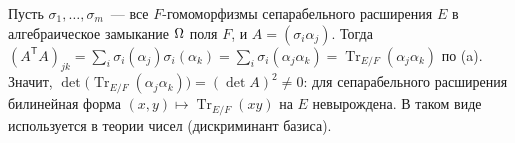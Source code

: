 \begin{remark}[5.16b]
Пусть $\sigma_1,\dots,\sigma_m$~--- все $F$-гомоморфизмы сепарабельного расширения $E$ в алгебраическое замыкание $\Omega$
поля $F$, и $A=(\sigma_i\alpha_j)$. Тогда $(A^{\mathsf T}A)_{jk}=\sum_i\sigma_i(\alpha_j)\sigma_i(\alpha_k)
=\sum_i\sigma_i(\alpha_j\alpha_k)=\operatorname{Tr}_{E/F}(\alpha_j\alpha_k)$ по (a). Значит,
$\det\bigl(\operatorname{Tr}_{E/F}(\alpha_j\alpha_k)\bigr)=(\det A)^2\ne0$: для сепарабельного расширения билинейная
форма $(x,y)\mapsto\operatorname{Tr}_{E/F}(xy)$ на $E$ невырождена. В таком виде  используется в теории
чисел (дискриминант базиса).
\end{remark}

